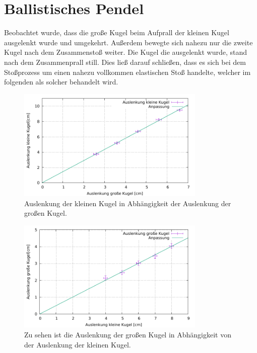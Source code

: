 \section{Ballistisches Pendel}\label{kap:Bal}
Beobachtet wurde, dass die große Kugel beim Aufprall der kleinen Kugel ausgelenkt wurde und umgekehrt. Außerdem bewegte sich nahezu nur die zweite Kugel nach dem Zusammenstoß weiter. Die Kugel die ausgelenkt wurde, stand nach dem Zusammenprall still. Dies ließ darauf schließen, dass es sich bei dem Stoßprozess um einen nahezu vollkommen elastischen Stoß handelte, welcher im folgenden als solcher behandelt wird.

\begin{figure}[h]
	\centering
	\includegraphics[width=0.8\textwidth]{res/GrosKlein.pdf}
	\caption{Auslenkung der kleinen Kugel in Abhängigkeit der Auslenkung der großen Kugel.}
	\label{fig:grosklein}
\end{figure}
\begin{figure}[h]
	\centering
	\includegraphics[width=0.8\textwidth]{res/KleinGros.pdf}
	\caption{Zu sehen ist die Auslenkung der großen Kugel in Abhängigkeit von der Auslenkung der kleinen Kugel.}
	\label{fig:kleingros}
\end{figure}

